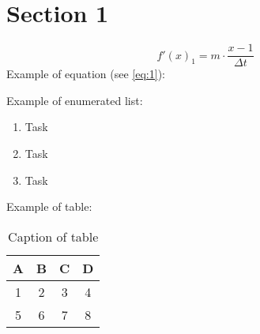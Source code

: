 \section{Section 1}


\begin{equation}\label{eq:1}
{f'(x)}_1 = m \cdot \frac{x-1}{\Delta t}
\end{equation}
Example of equation (see \ref{eq:1}):

Example of enumerated list:
\begin{enumerate}
	\item Task
	\item Task  
	\item Task 
\end{enumerate}


Example of table: \\

\begin{center}
\begin{table}[H]
\begin{tabular}{ |c|c|c|c| } 
 \hline
 A & B & C & D \\ 
 \hline
 1 & 2 & 3 & 4 \\
 5 & 6 & 7 & 8 \\
 \hline
\end{tabular}
\caption{\label{my_table} Caption of table}
\end{table}
\end{center}
